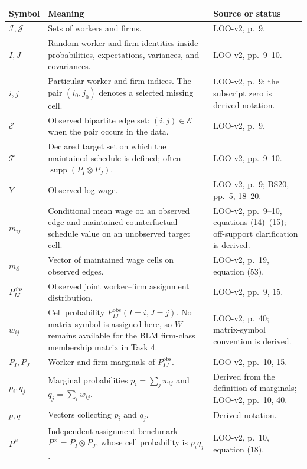 \documentclass[11pt]{article}
\begin{document}
\begin{longtable}{p{}p{}p{}}
\textbf{Symbol} & \textbf{Meaning} & \textbf{Source or status} \\
\hline
\(\mathcal I,\mathcal J\) & Sets of workers and firms. & LOO-v2, p.\ 9. \\
\(I,J\) & Random worker and firm identities inside probabilities,
expectations, variances, and covariances. &
LOO-v2, pp.\ 9--10. \\
\(i,j\) & Particular worker and firm indices.  The pair
\((i_0,j_0)\) denotes a selected missing cell. & LOO-v2, p.\ 9; the subscript
zero is derived notation. \\
\(\mathcal E\) & Observed bipartite edge set:
\((i,j)\in\mathcal E\) when the pair occurs in the data. & LOO-v2, p.\ 9. \\
\(\mathcal T\) & Declared target set on which the maintained schedule is
defined; often \(\operatorname{supp}(P_I\otimes P_J)\). & LOO-v2, pp.\ 9--10. \\
\(Y\) & Observed log wage. & LOO-v2, p.\ 9; BS20, pp.\ 5, 18--20. \\
\(m_{ij}\) & Conditional mean wage on an observed edge and maintained
counterfactual schedule value on an unobserved target cell. & LOO-v2,
pp.\ 9--10, equations (14)--(15); off-support clarification is derived. \\
\(m_{\mathcal E}\) & Vector of maintained wage cells on observed edges. &
LOO-v2, p.\ 19, equation (53). \\
\(P^{\mathrm{obs}}_{IJ}\) & Observed joint worker--firm assignment
distribution. & LOO-v2, pp.\ 9, 15. \\
\(w_{ij}\) & Cell probability
\(P^{\mathrm{obs}}_{IJ}(I=i,J=j)\).  No matrix symbol is assigned here, so
\(W\) remains available for the BLM firm-class membership matrix in Task 4. &
LOO-v2, p.\ 40; matrix-symbol convention is derived. \\
\(P_I,P_J\) & Worker and firm marginals of \(P^{\mathrm{obs}}_{IJ}\). &
LOO-v2, pp.\ 10, 15. \\
\(p_i,q_j\) & Marginal probabilities
\(p_i=\sum_jw_{ij}\) and \(q_j=\sum_iw_{ij}\). & Derived from the definition
of marginals; LOO-v2, pp.\ 10, 40. \\
\(p,q\) & Vectors collecting \(p_i\) and \(q_j\). & Derived notation. \\
\(P^\times\) & Independent-assignment benchmark
\(P^\times=P_I\otimes P_J\), whose cell probability is \(p_iq_j\). &
LOO-v2, p.\ 10, equation (18). \\

\end{longtable}
\end{document}
